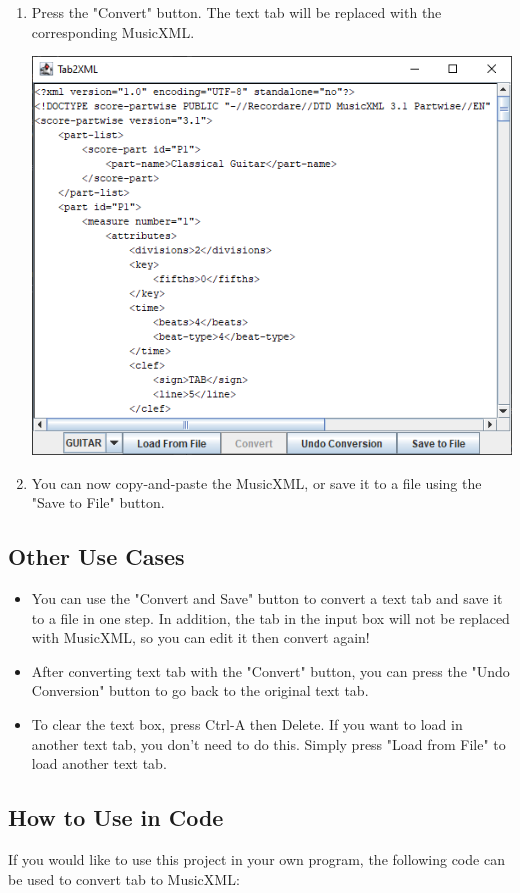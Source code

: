 \documentclass[11pt]{article}
\begin{document}
\begin{enumerate}
\begin{center}
\end{center}
\item Press the "Convert" button.  The text tab will be replaced with the corresponding MusicXML.
\begin{center}
\includegraphics[width=.9\linewidth]{../screendump-converted-20210217.png}
\end{center}
\item You can now copy-and-paste the MusicXML, or save it to a file using the "Save to File" button.
\end{enumerate}
\subsection{Other Use Cases}
\label{sec:org301f45d}
\begin{itemize}
\item You can use the "Convert and Save" button to convert a text tab and save it to a file in one step.  In addition, the tab in the input box will not be replaced with MusicXML, so you can edit it then convert again!
\item After converting text tab with the "Convert" button, you can press the "Undo Conversion" button to go back to the original text tab.
\item To clear the text box, press Ctrl-A then Delete.  If you want to load in another text tab, you don't need to do this.  Simply press "Load from File" to load another text tab.
\end{itemize}
\subsection{How to Use in Code}
\label{sec:orgfac87ba}
If you would like to use this project in your own program, the following code can be used to convert tab to MusicXML:
\end{document}
